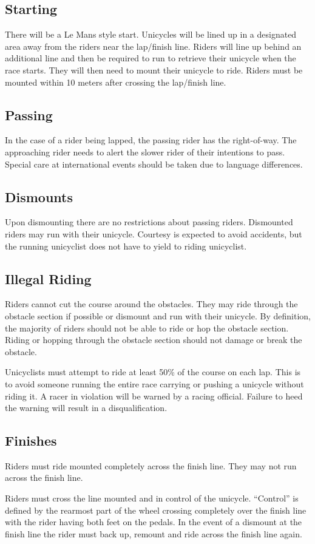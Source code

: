 \subsection{Starting}

There will be a Le Mans style start.
Unicycles will be lined up in a designated area away from the riders near the lap/finish line.
Riders will line up behind an additional line and then be required to run to retrieve their unicycle when the race starts.
They will then need to mount their unicycle to ride.
Riders must be mounted within 10 meters after crossing the lap/finish line.

\subsection{Passing}

In the case of a rider being lapped, the passing rider has the right-of-way.
The approaching rider needs to alert the slower rider of their intentions to pass.
Special care at international events should be taken due to language differences.

\subsection{Dismounts}

Upon dismounting there are no restrictions about passing riders.
Dismounted riders may run with their unicycle.
Courtesy is expected to avoid accidents, but the running unicyclist does not have to yield to riding unicyclist.

\subsection{Illegal Riding}

Riders cannot cut the course around the obstacles.
They may ride through the obstacle section if possible or dismount and run with their unicycle.
By definition, the majority of riders should not be able to ride or hop the obstacle section.
Riding or hopping through the obstacle section should not damage or break the obstacle.

Unicyclists must attempt to ride at least 50\% of the course on each lap.
This is to avoid someone running the entire race carrying or pushing a unicycle without riding it. 
A racer in violation will be warned by a racing official.
Failure to heed the warning will result in a disqualification.

\subsection{Finishes}

Riders must ride mounted completely across the finish line. They may not run across the finish line.

Riders must cross the line mounted and in control of the unicycle.
``Control'' is defined by the rearmost part of the wheel crossing completely over the finish line with the rider having both feet on the pedals.
In the event of a dismount at the finish line the rider must back up, remount and ride across the finish line again.
